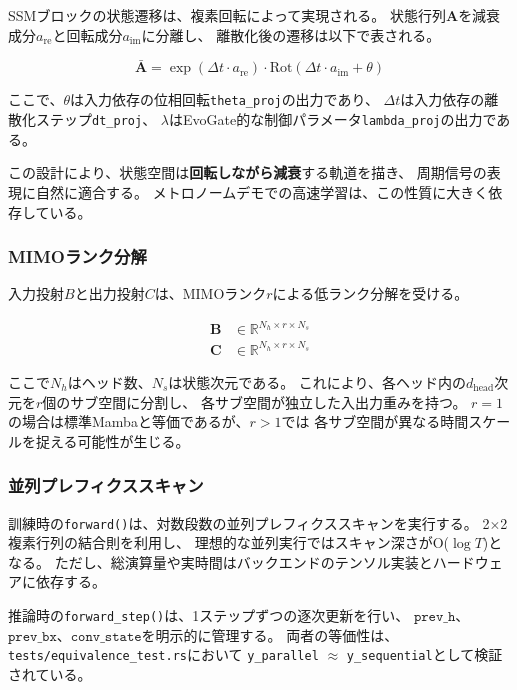 \documentclass[11pt,a4paper]{ltjsarticle}
\begin{document}
SSMブロックの状態遷移は、複素回転によって実現される。
状態行列$\mathbf{A}$を減衰成分$a_{\mathrm{re}}$と回転成分$a_{\mathrm{im}}$に分離し、
離散化後の遷移は以下で表される。

\begin{equation}
\bar{\mathbf{A}} = \exp(\Delta t \cdot a_{\mathrm{re}}) \cdot
\mathrm{Rot}\!\left(\Delta t \cdot a_{\mathrm{im}} + \theta\right)
\label{eq:complex_rotation}
\end{equation}

ここで、$\theta$は入力依存の位相回転\texttt{theta\_proj}の出力であり、
$\Delta t$は入力依存の離散化ステップ\texttt{dt\_proj}、
$\lambda$はEvoGate的な制御パラメータ\texttt{lambda\_proj}の出力である。

この設計により、状態空間は\textbf{回転しながら減衰}する軌道を描き、
周期信号の表現に自然に適合する。
メトロノームデモでの高速学習は、この性質に大きく依存している。

\subsubsection{MIMOランク分解}

入力投射$B$と出力投射$C$は、MIMOランク$r$による低ランク分解を受ける。

\begin{align}
\mathbf{B} &\in \mathbb{R}^{N_h \times r \times N_s} \\
\mathbf{C} &\in \mathbb{R}^{N_h \times r \times N_s}
\end{align}

ここで$N_h$はヘッド数、$N_s$は状態次元である。
これにより、各ヘッド内の$d_{\mathrm{head}}$次元を$r$個のサブ空間に分割し、
各サブ空間が独立した入出力重みを持つ。
$r=1$の場合は標準Mambaと等価であるが、$r>1$では
各サブ空間が異なる時間スケールを捉える可能性が生じる。

\subsubsection{並列プレフィクススキャン}

訓練時の\texttt{forward()}は、対数段数の並列プレフィクススキャンを実行する。
2$\times$2複素行列の結合則を利用し、
理想的な並列実行ではスキャン深さがO($\log T$)となる。
ただし、総演算量や実時間はバックエンドのテンソル実装とハードウェアに依存する。

推論時の\texttt{forward\_step()}は、1ステップずつの逐次更新を行い、
$\texttt{prev\_h}$、$\texttt{prev\_bx}$、$\texttt{conv\_state}$を明示的に管理する。
両者の等価性は、\texttt{tests/equivalence\_test.rs}において
\texttt{y\_parallel} $\approx$ \texttt{y\_sequential}として検証されている。
\end{document}

